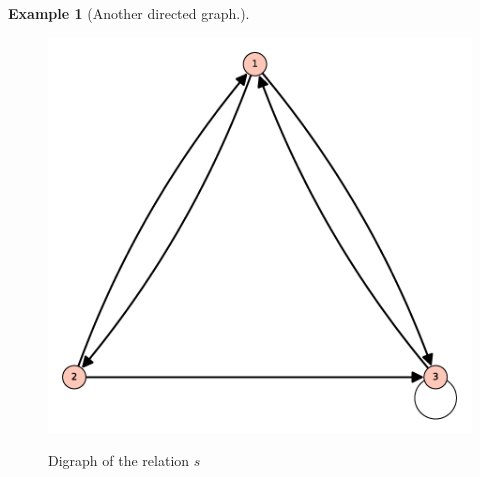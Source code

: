 \documentclass[10pt,]{book}
\theoremstyle{plain}
\theoremstyle{definition}
\theoremstyle{definition}
\theoremstyle{definition}
\newtheorem{example}[theorem]{Example}
\theoremstyle{definition}
\begin{document}
\begin{example}[Another directed graph.]
\begin{figure}
{\includegraphics[width=1\linewidth]{images/graph-6-2-3.png}}
\caption{Digraph of the relation \(s\)\label{fig-graph-6-2-3}}
\end{figure}
\end{example}
\end{document}
